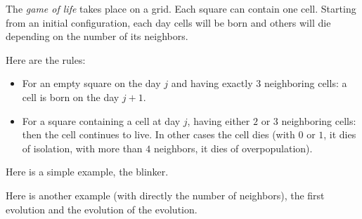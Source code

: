 \documentclass[11pt,class=report,crop=false]{standalone}
\begin{document}
\begin{cours}
The \emph{game of life} takes place on a grid. Each square can contain one cell. Starting from an initial configuration, each day cells will be born and others will die depending on the number of its neighbors.

Here are the rules:
\begin{itemize}
  \item For an empty square on the day $j$ and having exactly $3$ neighboring cells: a cell is born on the day $j+1$.


  \item For a square containing a cell at day $j$, having either $2$ or $3$ neighboring cells: then the cell continues to live.
  In other cases the cell dies (with $0$ or $1$, it dies of isolation, with more than $4$ neighbors, it dies of overpopulation).
  
  \medskip
  

   \medskip
    
\end{itemize}

Here is a simple example, the \og{}blinker\fg{}.

 
Here is another example (with directly the number of neighbors), the first evolution and the evolution of the evolution.

\end{cours}



\end{document}
